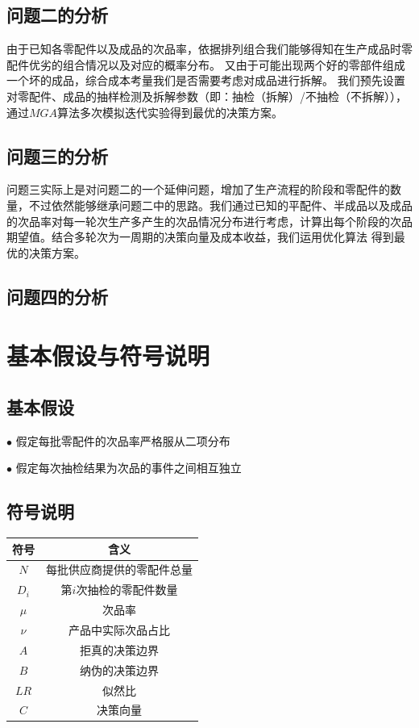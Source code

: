 \documentclass[withoutpreface,bwprint]{cumcmthesis} %
\begin{document}
\subsection{问题二的分析}
由于已知各零配件以及成品的次品率，依据排列组合我们能够得知在生产成品时零配件优劣的组合情况以及对应的概率分布。
又由于可能出现两个好的零部件组成一个坏的成品，综合成本考量我们是否需要考虑对成品进行拆解。
我们预先设置对零配件、成品的抽样检测及拆解参数（即：抽检（拆解）/不抽检（不拆解）），通过$MGA$算法多次模拟迭代实验得到最优的决策方案。
\subsection{问题三的分析}
问题三实际上是对问题二的一个延伸问题，增加了生产流程的阶段和零配件的数量，不过依然能够继承问题二中的思路。我们通过已知的平配件、半成品以及成品
的次品率对每一轮次生产多产生的次品情况分布进行考虑，计算出每个阶段的次品期望值。结合多轮次为一周期的决策向量及成本收益，我们运用优化算法
得到最优的决策方案。
\subsection{问题四的分析}
\section{基本假设与符号说明}
\subsection{基本假设}
$\bullet$ 假定每批零配件的次品率严格服从二项分布

$\bullet$ 假定每次抽检结果为次品的事件之间相互独立

\subsection{符号说明}
\begin{table}[H]
	\centering
	\setlength{\tabcolsep}{20mm}%
	\begin{tabular}{cc}
		\toprule[1.5pt]
		\textbf{符号} & \textbf{含义}   \\  %
		\midrule[1pt]
		$N$         & 每批供应商提供的零配件总量 \\
		$D_{i}$     & 第$i$次抽检的零配件数量 \\
		$\mu$       & 次品率           \\
		$\nu$       & 产品中实际次品占比      \\
		$A$         & 拒真的决策边界       \\
		$B$         & 纳伪的决策边界       \\
		$LR$        & 似然比           \\
		$C$         & 决策向量          \\
		\bottomrule[1.5pt]
	\end{tabular}
\end{table}
\end{document}
